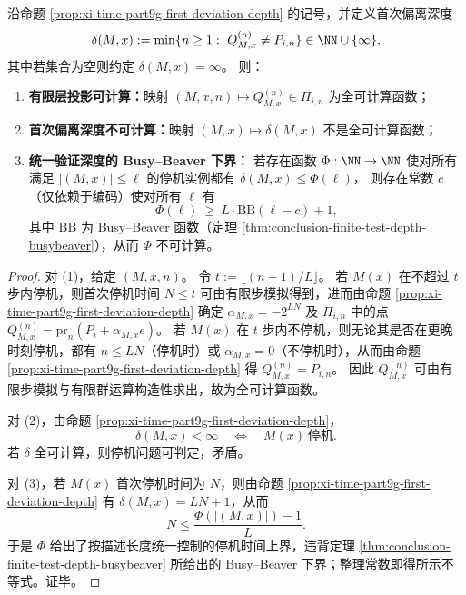 \begin{proposition}[有限层扭子投影的可计算性与首次偏离深度的停机不可计算性]\label{prop:xi-time-part9g-deviation-depth-computability-separation}
沿命题 \ref{prop:xi-time-part9g-first-deviation-depth} 的记号，并定义首次偏离深度
\[
\delta(M,x):=\min\{n\ge 1:\ Q_{M,x}^{(n)}\neq P_{i,n}\}\in\NN\cup\{\infty\},
\]
其中若集合为空则约定 \(\delta(M,x)=\infty\)。
则：
\begin{enumerate}
\normalfont
  \item \textbf{有限层投影可计算：}映射 \((M,x,n)\mapsto Q_{M,x}^{(n)}\in\Pi_{i,n}\) 为全可计算函数；
  \item \textbf{首次偏离深度不可计算：}映射 \((M,x)\mapsto \delta(M,x)\) 不是全可计算函数；
  \item \textbf{统一验证深度的 Busy--Beaver 下界：}
  若存在函数 \(\Phi:\NN\to\NN\) 使对所有满足 \(|(M,x)|\le \ell\) 的停机实例都有 \(\delta(M,x)\le \Phi(\ell)\)，
  则存在常数 \(c\)（仅依赖于编码）使对所有 \(\ell\) 有
  \[
  \Phi(\ell)\ \ge\ L\cdot \mathrm{BB}(\ell-c)+1,
  \]
  其中 \(\mathrm{BB}\) 为 Busy--Beaver 函数（定理 \ref{thm:conclusion-finite-test-depth-busybeaver}），从而 \(\Phi\) 不可计算。
\end{enumerate}
\end{proposition}
\begin{proof}
对 (1)，给定 \((M,x,n)\)。
令 \(t:=\lfloor (n-1)/L\rfloor\)。
若 \(M(x)\) 在不超过 \(t\) 步内停机，则首次停机时间 \(N\le t\) 可由有限步模拟得到，进而由命题 \ref{prop:xi-time-part9g-first-deviation-depth} 确定 \(\alpha_{M,x}=-2^{LN}\) 及 \(\Pi_{i,n}\) 中的点 \(Q_{M,x}^{(n)}=\mathrm{pr}_n(P_i+\alpha_{M,x}e)\)。
若 \(M(x)\) 在 \(t\) 步内不停机，则无论其是否在更晚时刻停机，都有 \(n\le LN\)（停机时）或 \(\alpha_{M,x}=0\)（不停机时），从而由命题 \ref{prop:xi-time-part9g-first-deviation-depth} 得 \(Q_{M,x}^{(n)}=P_{i,n}\)。
因此 \(Q_{M,x}^{(n)}\) 可由有限步模拟与有限群运算构造性求出，故为全可计算函数。
\par
对 (2)，由命题 \ref{prop:xi-time-part9g-first-deviation-depth}，
\[
\delta(M,x)<\infty\quad\Longleftrightarrow\quad M(x)\ \text{停机}.
\]
若 \(\delta\) 全可计算，则停机问题可判定，矛盾。
\par
对 (3)，若 \(M(x)\) 首次停机时间为 \(N\)，则由命题 \ref{prop:xi-time-part9g-first-deviation-depth} 有 \(\delta(M,x)=LN+1\)，从而
\[
N\le \frac{\Phi(|(M,x)|)-1}{L}.
\]
于是 \(\Phi\) 给出了按描述长度统一控制的停机时间上界，违背定理 \ref{thm:conclusion-finite-test-depth-busybeaver} 所给出的 Busy--Beaver 下界；整理常数即得所示不等式。证毕。
\end{proof}

